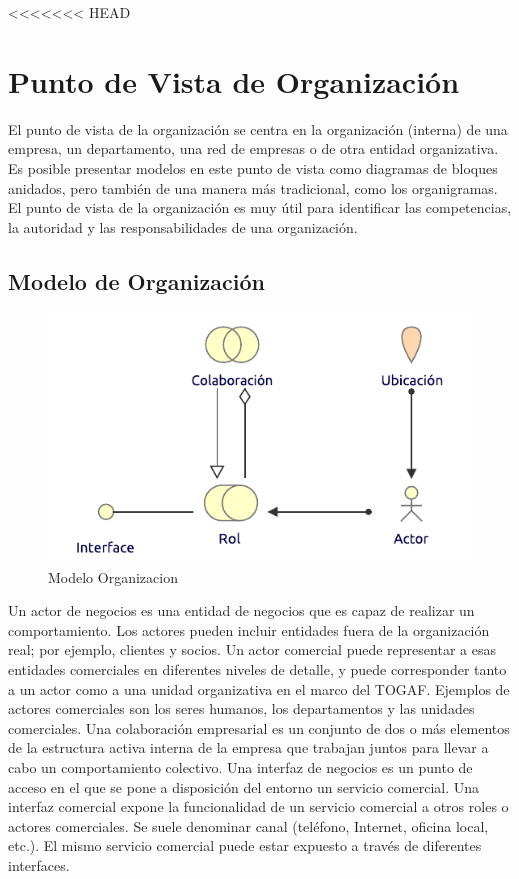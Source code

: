 <<<<<<< HEAD
\section{Punto de Vista de Organización}

El punto de vista de la organización se centra en la organización (interna) de una empresa, un departamento, una red de empresas o de otra entidad organizativa. Es posible presentar modelos en este punto de vista como diagramas de bloques anidados, pero también de una manera más tradicional, como los organigramas. El punto de vista de la organización es muy útil para identificar las competencias, la autoridad y las responsabilidades de una organización.

\subsection{Modelo de Organización}
\begin{figure}[h!]
	\centering
	\includegraphics[width=.6\linewidth]{imgs/modelo/Organizacion}
	\caption{Modelo Organizacion}
\end{figure}

Un actor de negocios es una entidad de negocios que es capaz de realizar un comportamiento. Los actores pueden incluir entidades fuera de la organización real; por ejemplo, clientes y socios. Un actor comercial puede representar a esas entidades comerciales en diferentes niveles de detalle, y puede corresponder tanto a un actor como a una unidad organizativa en el marco del TOGAF. Ejemplos de actores comerciales son los seres humanos, los departamentos y las unidades comerciales. Una colaboración empresarial es un conjunto de dos o más elementos de la estructura activa interna de la empresa que trabajan juntos para llevar a cabo un comportamiento colectivo. Una interfaz de negocios es un punto de acceso en el que se pone a disposición del entorno un servicio comercial. Una interfaz comercial expone la funcionalidad de un servicio comercial a otros roles o actores comerciales. Se suele denominar canal (teléfono, Internet, oficina local, etc.). El mismo servicio comercial puede estar expuesto a través de diferentes interfaces.

